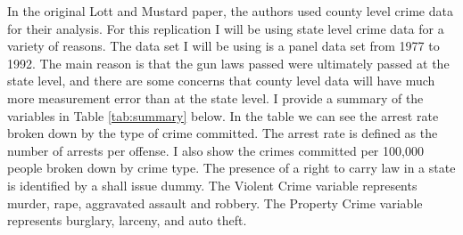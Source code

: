 \documentclass{article}
\begin{document}
In the original Lott and Mustard paper, the authors used county level crime data for their analysis. For this replication I will be using state level crime data for a variety of reasons. The data set I will be using is a panel data set from 1977 to 1992. The main reason is that the gun laws passed were ultimately passed at the state level, and there are some concerns that county level data will have much more measurement error than at the state level. I provide a summary of the variables in Table \ref{tab:summary} below. In the table we can see the arrest rate broken down by the type of crime committed. The arrest rate is defined as the number of arrests per offense. I also show the crimes committed per 100,000 people broken down by crime type. The presence of a right to carry law in a state is identified by a shall issue dummy. The Violent Crime variable represents murder, rape, aggravated assault and robbery. The Property Crime variable represents burglary, larceny, and auto theft.
\end{document}
